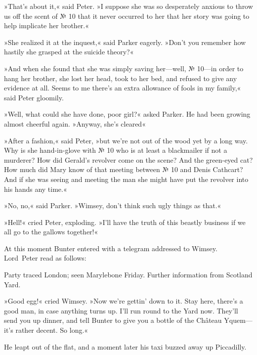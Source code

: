 »That's about it,« said Peter. »I suppose she was so desperately anxious to throw us off the scent of № 10 that it never occurred to her that her story was going to help implicate her brother.«

»She realized it at the inquest,« said Parker eagerly. »Don't you remember how hastily she grasped at the suicide theory?«

»And when she found that she was simply saving her—well, № 10—in order to hang her brother, she lost her head, took to her bed, and refused to give any evidence at all. Seems to me there's an extra allowance of fools in my family,« said Peter gloomily.

»Well, what could she have done, poor girl?« asked Parker. He had been growing almost cheerful again. »Anyway, she's cleared\longdash«

»After a fashion,« said Peter, »but we're not out of the wood yet by a long way. Why is she hand-in-glove with № 10 who is at least a blackmailer if not a murderer? How did Gerald's revolver come on the scene? And the green-eyed cat? How much did Mary know of that meeting between № 10 and Denis Cathcart? And if she was seeing and meeting the man she might have put the revolver into his hands any time.«

»No, no,« said Parker. »Wimsey, don't think such ugly things as that.«

»Hell!« cried Peter, exploding. »I'll have the truth of this beastly business if we all go to the gallows together!«

At this moment Bunter entered with a telegram addressed to Wimsey. Lord~Peter read as follows:

\begin{telegram}{}
	Party traced London; seen Marylebone Friday. Further information from Scotland Yard.
\end{telegram}

»Good egg!« cried Wimsey. »Now we're gettin' down to it. Stay here, there's a good man, in case anything turns up. I'll run round to the Yard now. They'll send you up dinner, and tell Bunter to give you a bottle of the Château Yquem—it's rather decent. So long.«

He leapt out of the flat, and a moment later his taxi buzzed away up Piccadilly.
